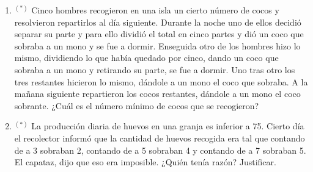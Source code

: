\documentclass[a4paper,12pt,twoside,spanish,reqno]{amsbook}
\numberwithin{equation}{section}
\begin{document}
\begin{enumerate}[resume]
\item${}^{(*)}$ Cinco hombres recogieron en una isla un cierto número de cocos y resolvieron repartirlos al día siguiente. Durante la noche uno de ellos decidió separar su parte y para ello dividió el total en cinco partes y dió un coco que sobraba a un mono y se fue a dormir. Enseguida otro de los hombres hizo lo mismo, dividiendo lo que había quedado por cinco, dando un coco que sobraba a un mono y retirando su parte, se fue a dormir. Uno tras otro los tres restantes hicieron lo mismo, dándole a un mono el coco que sobraba. A la ma\~nana siguiente repartieron los cocos restantes, dándole a un mono el coco sobrante. ¿Cuál es el número mínimo de cocos que se recogieron?


\item${}^{(*)}$ La producción diaria de huevos en una granja es inferior a 75. Cierto día el recolector informó que la cantidad de huevos recogida era tal que contando de a 3 sobraban 2, contando de a 5 sobraban 4 y contando de a 7 sobraban 5. El capataz, dijo que eso era imposible. ¿Quién tenía razón? Justificar.

%
\end{enumerate}
\end{document}
